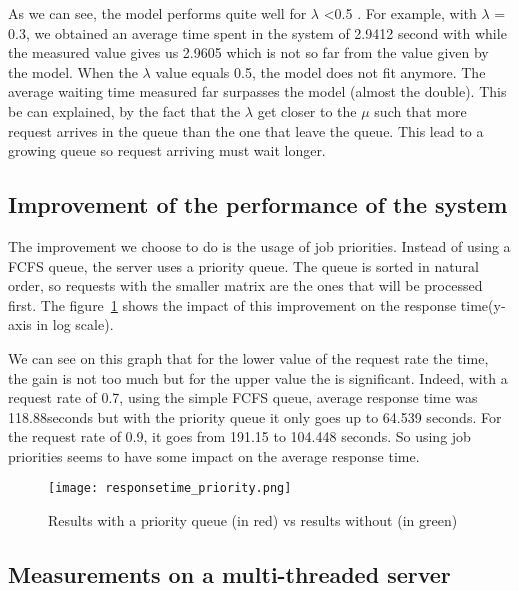 As we can see, the model performs quite well for $\lambda$ <0.5 . For example, with $\lambda$ = 0.3,
we obtained an average time spent in the system of 2.9412 second with while the measured value gives us
2.9605 which is not so far from the value given by the model. When the $\lambda$ value equals 0.5, the
model does not fit anymore. The average waiting time measured far surpasses the model (almost the
double). This be can explained, by the fact that the $\lambda$ get closer to the $\mu$ such that more
request arrives in the queue than the one that leave the queue. This lead to a growing queue so request
arriving must wait longer.


\subsection{Improvement of the performance of the system}
\label{sub:Improvement of the performance of the system}
The improvement we choose to do is the usage of job priorities. Instead of using a FCFS queue,
the server uses a priority queue. The queue is sorted in natural order, so requests with the smaller matrix
are the ones that will be processed first. The figure~\ref{fig:priorityqueue} shows the impact of this
improvement on the response time(y-axis in log scale).

We can see on this graph that for the lower value of the request rate the time, the gain is not too much but
for the upper value the is significant. Indeed, with a request rate of 0.7, using the simple FCFS queue, average
response time was 118.88seconds but with the priority queue it only goes up to 64.539 seconds. For the
request rate of 0.9, it goes from 191.15 to 104.448 seconds. So using job priorities seems to have
some impact on the average response time.

\begin{figure}[!ht]
    \centering
    \texttt{[image: responsetime\_priority.png]}
    \caption{Results with a priority queue (in red) vs results without (in green)}
    \label{fig:priorityqueue}
\end{figure}

\subsection{Measurements on a multi-threaded server}
\label{sub:Measurements on a multi-threaded server}



